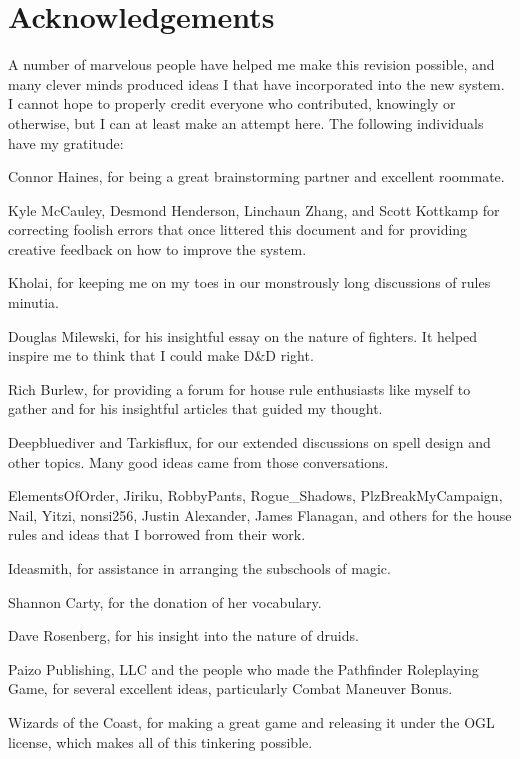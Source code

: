 \chapter*{Acknowledgements}
A number of marvelous people have helped me make this revision possible, and many clever minds produced ideas I that have incorporated into the new system. I cannot hope to properly credit everyone who contributed, knowingly or otherwise, but I can at least make an attempt here. The following individuals have my gratitude:

Connor Haines, for being a great brainstorming partner and excellent roommate.

Kyle McCauley, Desmond Henderson, Linchaun Zhang, and Scott Kottkamp for correcting foolish errors that once littered this document and for providing creative feedback on how to improve the system.

Kholai, for keeping me on my toes in our monstrously long discussions of rules minutia.

Douglas Milewski, for his insightful essay on the nature of fighters. It helped inspire me to think that I could make D\&D right.

Rich Burlew, for providing a forum for house rule enthusiasts like myself to gather and for his insightful articles that guided my thought.

Deepbluediver and Tarkisflux, for our extended discussions on spell design and other topics. Many good ideas came from those conversations.

ElementsOfOrder, Jiriku, RobbyPants, Rogue\_Shadows, PlzBreakMyCampaign, Nail, Yitzi, nonsi256, Justin Alexander, James Flanagan, and others for the house rules and ideas that I borrowed from their work.

Ideasmith, for assistance in arranging the subschools of magic.

Shannon Carty, for the donation of her vocabulary.

Dave Rosenberg, for his insight into the nature of druids.

Paizo Publishing, LLC and the people who made the Pathfinder Roleplaying Game, for several excellent ideas, particularly Combat Maneuver Bonus.

Wizards of the Coast, for making a great game and releasing it under the OGL license, which makes all of this tinkering possible.